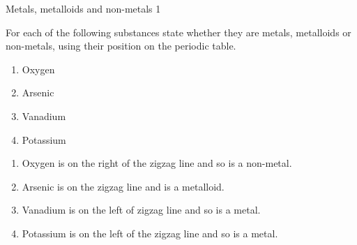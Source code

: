       \begin{wex}{Metals, metalloids and non-metals 1}{\label{m38708*eip-77}
  \label{m38708*eip-252}
For each of the following substances state whether they are metals, metalloids or non-metals, using their position on the periodic table.
\label{m38708*eip-id1170734629720}
\begin{enumerate}[noitemsep, label=\textbf{\alph*}. ] 
            \leftskip=20pt\rightskip=\leftskip
\item Oxygen
\item Arsenic
\item Vanadium
\item Potassium
\end{enumerate}
  \par }
{\vspace{5pt}
{} 
\begin{enumerate}[noitemsep, label=\textbf{\alph*}. ]
\item Oxygen is on the right of the zigzag line and so is a non-metal.
\item Arsenic is on the zigzag line and is a metalloid.
\item Vanadium is on the left of zigzag line and so is a metal.
\item Potassium is on the left of the zigzag line and so is a metal.\end{enumerate}
}
    \end{wex}
  \par
